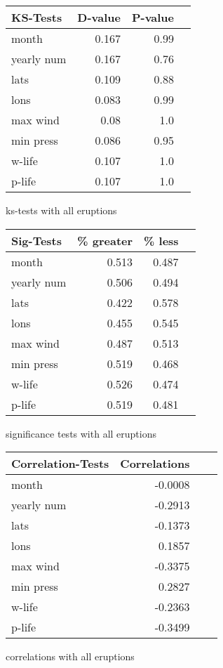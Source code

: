 \begin{figure}[!tbp]
\centering
\begin{minipage}[b]{0.45\textwidth}
\begin{tabular}{lrrr}
\toprule
             KS-Tests &     D-value &      P-value\\
\midrule

month & 0.167 & 0.99 \\
yearly num & 0.167 & 0.76 \\
lats & 0.109 & 0.88 \\
lons & 0.083 & 0.99 \\
max wind & 0.08 & 1.0 \\
min press & 0.086 & 0.95 \\
w-life & 0.107 & 1.0 \\
p-life & 0.107 & 1.0 \\

\bottomrule
\end{tabular}
\caption{ks-tests with all eruptions}
\label{ks_all}
\end{minipage}
\hfill
\begin{minipage}[b]{0.45\textwidth}
\begin{tabular}{lrrr}
\toprule
             Sig-Tests & \% greater &  \% less \\
\midrule

month & 0.513 & 0.487 \\
yearly num & 0.506 & 0.494 \\
lats & 0.422 & 0.578 \\
lons & 0.455 & 0.545 \\
max wind & 0.487 & 0.513 \\
min press & 0.519 & 0.468 \\
w-life & 0.526 & 0.474 \\
p-life & 0.519 & 0.481 \\

\bottomrule
\end{tabular}
\caption{significance tests with all eruptions}
\label{sig_all}
\end{minipage}
\end{figure}

\begin{figure}[!tbp]
\centering
\begin{tabular}{lrrr}
\toprule
             Correlation-Tests &     Correlations \\
\midrule

month & -0.0008 \\
yearly num & -0.2913 \\
lats & -0.1373 \\
lons & 0.1857 \\
max wind & -0.3375 \\
min press & 0.2827 \\
w-life & -0.2363 \\
p-life & -0.3499 \\

\bottomrule
\end{tabular}
\caption{correlations with all eruptions}
\label{corr_all}
\end{figure}


